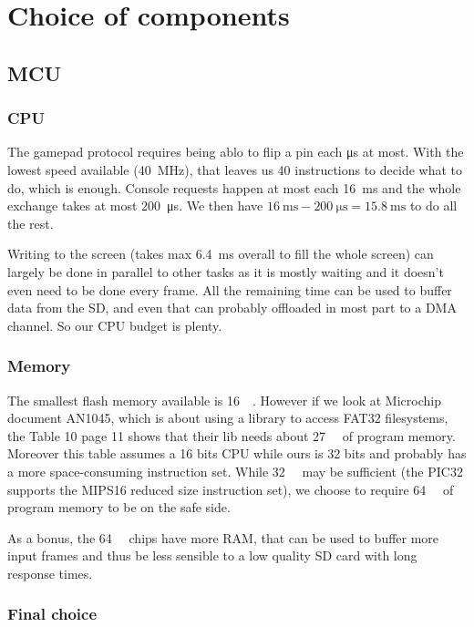 \documentclass[a4paper,oneside,12pt]{article}
\begin{document}
\section{Choice of components}
\subsection{MCU}
\subsubsection{CPU}
The gamepad protocol requires being ablo to flip a pin each \si{\us} at
most. With the lowest speed available (\SI{40}{\MHz}), that leaves us 40
instructions to decide what to do, which is enough. Console requests happen at
most each \SI{16}{\ms} and the whole exchange takes at most \SI{200}{\us}. We
then have $\SI{16}{\ms} - \SI{200}{\us} = \SI{15.8}{\ms}$ to do all the rest.

Writing to the screen (takes max \SI{6.4}{\ms} overall to fill the whole
screen) can largely be done in parallel to other tasks as it is mostly waiting
and it doesn't even need to be done every frame. All the remaining time can be
used to buffer data from the SD, and even that can probably offloaded in most
part to a DMA channel. So our CPU budget is plenty.

\subsubsection{Memory}

The smallest flash memory available is \SI{16}{\kibi\byte}. However if we look
at Microchip document AN1045, which is about using a library to access FAT32
filesystems, the Table 10 page 11 shows that their lib needs about
\SI{27}{\kibi\byte} of program memory. Moreover this table assumes a 16 bits CPU
while ours is 32 bits and probably has a more space-consuming instruction
set. While \SI{32}{\kibi\byte} may be sufficient (the PIC32 supports the MIPS16
reduced size instruction set), we choose to require \SI{64}{\kibi\byte} of
program memory to be on the safe side.

As a bonus, the \SI{64}{\kibi\byte} chips have more RAM, that can be used to
buffer more input frames and thus be less sensible to a low quality SD card with
long response times.

\subsubsection{Final choice}
\end{document}
